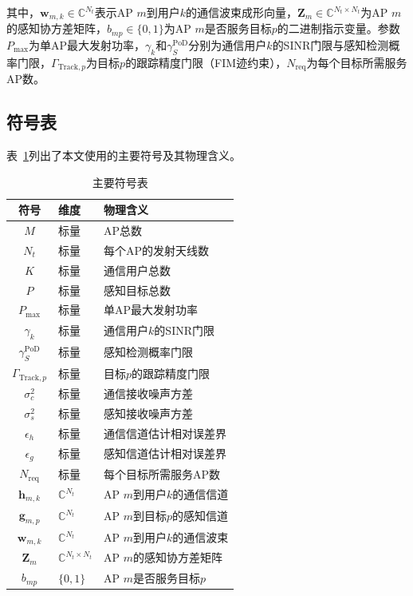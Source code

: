 \documentclass[12pt,a4paper]{article}
\newcommand{\vect}[1]{\mathbf{#1}}
\newcommand{\mat}[1]{\mathbf{#1}}
\begin{document}
其中，$\vect{w}_{m,k} \in \mathbb{C}^{N_t}$表示AP $m$到用户$k$的通信波束成形向量，$\mat{Z}_m \in \mathbb{C}^{N_t \times N_t}$为AP $m$的感知协方差矩阵，$b_{mp} \in \{0,1\}$为AP $m$是否服务目标$p$的二进制指示变量。参数$P_{\max}$为单AP最大发射功率，$\gamma_k$和$\gamma_S^{\text{PoD}}$分别为通信用户$k$的SINR门限与感知检测概率门限，$\Gamma_{\text{Track},p}$为目标$p$的跟踪精度门限（FIM迹约束），$N_{\text{req}}$为每个目标所需服务AP数。

\subsection{符号表}

表~\ref{tab:symbols}列出了本文使用的主要符号及其物理含义。

\begin{table}[htbp]
\centering
\caption{主要符号表}\label{tab:symbols}
\begin{tabular}{cll}
\toprule
符号 & 维度 & 物理含义 \\
\midrule
$M$ & 标量 & AP总数 \\
$N_t$ & 标量 & 每个AP的发射天线数 \\
$K$ & 标量 & 通信用户总数 \\
$P$ & 标量 & 感知目标总数 \\
$P_{\max}$ & 标量 & 单AP最大发射功率 \\
$\gamma_k$ & 标量 & 通信用户$k$的SINR门限 \\
$\gamma_S^{\text{PoD}}$ & 标量 & 感知检测概率门限 \\
$\Gamma_{\text{Track},p}$ & 标量 & 目标$p$的跟踪精度门限 \\
$\sigma_c^2$ & 标量 & 通信接收噪声方差 \\
$\sigma_s^2$ & 标量 & 感知接收噪声方差 \\
$\epsilon_h$ & 标量 & 通信信道估计相对误差界 \\
$\epsilon_g$ & 标量 & 感知信道估计相对误差界 \\
$N_{\text{req}}$ & 标量 & 每个目标所需服务AP数 \\
$\vect{h}_{m,k}$ & $\mathbb{C}^{N_t}$ & AP $m$到用户$k$的通信信道 \\
$\vect{g}_{m,p}$ & $\mathbb{C}^{N_t}$ & AP $m$到目标$p$的感知信道 \\
$\vect{w}_{m,k}$ & $\mathbb{C}^{N_t}$ & AP $m$到用户$k$的通信波束 \\
$\mat{Z}_m$ & $\mathbb{C}^{N_t \times N_t}$ & AP $m$的感知协方差矩阵 \\
$b_{mp}$ & $\{0,1\}$ & AP $m$是否服务目标$p$ \\
\bottomrule
\end{tabular}
\end{table}
\end{document}
